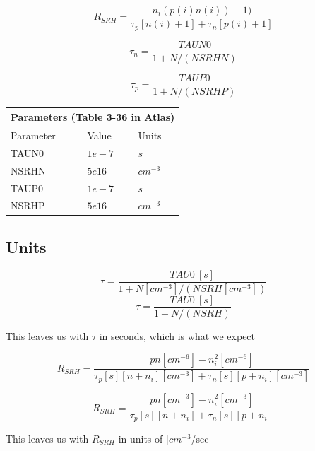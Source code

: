 \documentclass[12pt]{article}
\begin{document}
\begin{equation}
R_{SRH}=
\frac
{n_{i}(p(i)n(i))-1)}
{\tau_{p}[n(i)+1]+
	\tau_{n}[p(i)+1]}
\end{equation}

\begin{equation}
\tau_{n}=\frac{TAUN0}{1+N/(NSRHN)}
\end{equation}

\begin{equation}
\tau_{p}=\frac{TAUP0}{1+N/(NSRHP)}
\end{equation}


\begin{center}
	\begin{tabular}{ |p{3cm}|p{3cm}|p{3cm}| }
		\hline
		\multicolumn{3}{|c|}{Parameters (Table 3-36 in Atlas)} \\
		\hline
		Parameter&Value&Units\\
		\hline
		TAUN0 & $1e-7$ & $s$\\
		NSRHN & $5e16$ & $cm^{-3}$\\
		TAUP0 & $1e-7$ & $s$\\
		NSRHP & $5e16$ & $cm^{-3}$\\
		\hline
	\end{tabular}
\end{center}

\subsection{Units}
\begin{equation}
\tau=\frac{TAU0 \ [s]}{1+N [cm^{-3}] /(NSRH [cm^{-3}])}
\end{equation}
\begin{equation}
\tau=\frac{TAU0 \ [s]}{1+N/(NSRH)}
\end{equation}

This leaves us with $ \tau $ in seconds, which is what we expect

\begin{equation}
R_{SRH}=
\frac
{pn [cm^{-6}] -n_{i}^{2}[cm^{-6}]}
{\tau_{p} [s] [n+n_{i}] [cm^{-3}]+
 \tau_{n} [s] [p+n_{i}] [cm^{-3}]}
\end{equation}

\begin{equation}
R_{SRH}=
\frac
{pn [cm^{-3}] -n_{i}^{2}[cm^{-3}]}
{\tau_{p} [s] [n+n_{i}] +
	\tau_{n} [s] [p+n_{i}]}
\end{equation}

This leaves us with $ R_{SRH} $ in units of [$cm^{-3}$/sec]
\end{document}
